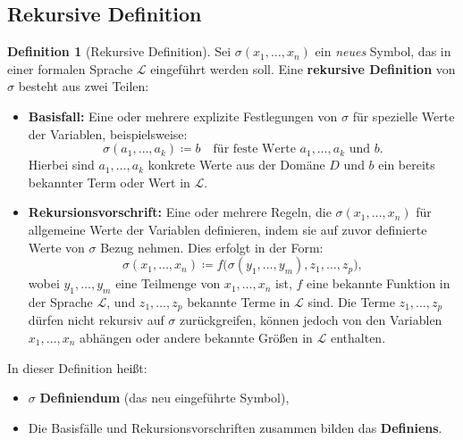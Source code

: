 \documentclass{book}
\theoremstyle{plain}
\theoremstyle{remark}
\theoremstyle{definition}
\newtheorem{definition}{Definition}[section]
\begin{document}
\subsection{Rekursive Definition}

\begin{definition}[Rekursive Definition]
Sei \(\sigma(x_1, \ldots, x_n)\) ein \emph{neues} Symbol, das in einer formalen Sprache \(\mathcal{L}\) eingeführt werden soll. Eine \textbf{rekursive Definition} von \(\sigma\) besteht aus zwei Teilen:

\begin{itemize}
    \item \textbf{Basisfall:} Eine oder mehrere explizite Festlegungen von \(\sigma\) für spezielle Werte der Variablen, beispielsweise:
    \[
    \sigma(a_1, \ldots, a_k) \coloneqq b \quad \text{für feste Werte } a_1, \ldots, a_k \text{ und } b.
    \]
    Hierbei sind \(a_1, \ldots, a_k\) konkrete Werte aus der Domäne \(D\) und \(b\) ein bereits bekannter Term oder Wert in \(\mathcal{L}\).
    
    \item \textbf{Rekursionsvorschrift:} Eine oder mehrere Regeln, die \(\sigma(x_1, \ldots, x_n)\) für allgemeine Werte der Variablen definieren, indem sie auf zuvor definierte Werte von \(\sigma\) Bezug nehmen. Dies erfolgt in der Form:
    \[
    \sigma(x_1, \ldots, x_n) \coloneqq f\big(\sigma(y_1, \ldots, y_m), z_1, \ldots, z_p\big),
    \]
    wobei \(y_1, \ldots, y_m\) eine Teilmenge von \(x_1, \ldots, x_n\) ist, \(f\) eine bekannte Funktion in der Sprache \(\mathcal{L}\), und \(z_1, \ldots, z_p\) bekannte Terme in \(\mathcal{L}\) sind. Die Terme \(z_1, \ldots, z_p\) dürfen nicht rekursiv auf \(\sigma\) zurückgreifen, können jedoch von den Variablen \(x_1, \ldots, x_n\) abhängen oder andere bekannte Größen in \(\mathcal{L}\) enthalten.
\end{itemize}

In dieser Definition heißt:
\begin{itemize}
    \item \(\sigma\) \textbf{Definiendum} (das neu eingeführte Symbol),
    \item Die Basisfälle und Rekursionsvorschriften zusammen bilden das \textbf{Definiens}.
\end{itemize}

\noindent

\end{definition}
\end{document}
